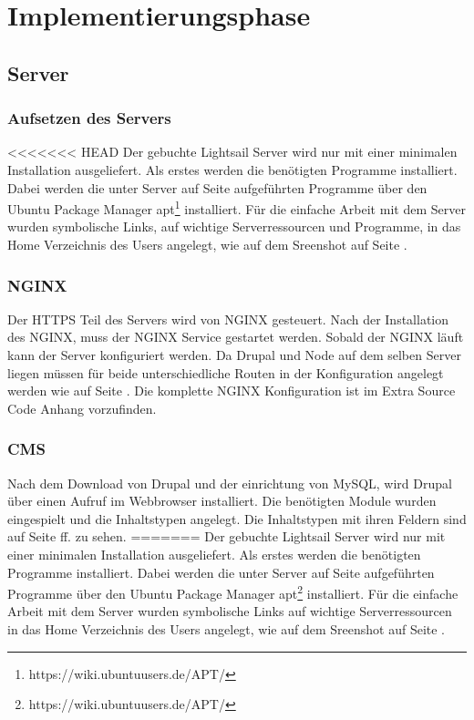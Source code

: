 \documentclass[11pt,a4paper]{article}
\begin{document}
\section{Implementierungsphase}
\subsection{Server}
\subsubsection{Aufsetzen des Servers}
<<<<<<< HEAD
Der gebuchte Lightsail Server wird nur mit einer minimalen Installation ausgeliefert. Als erstes werden die benötigten Programme installiert. Dabei werden die unter Server auf Seite \pageref{sec:progs} aufgeführten Programme über den Ubuntu Package Manager apt\footnote{https://wiki.ubuntuusers.de/APT/} installiert. Für die einfache Arbeit mit dem Server wurden symbolische Links, auf wichtige Serverressourcen und Programme, in das Home Verzeichnis des Users angelegt, wie auf dem Sreenshot auf Seite \pageref{sec:ordner} .
\subsubsection{NGINX}
Der HTTPS Teil des Servers wird von NGINX gesteuert. Nach der Installation des NGINX, muss der NGINX Service gestartet werden. Sobald der NGINX läuft kann der Server konfiguriert werden. Da Drupal und Node auf dem selben Server liegen müssen für beide unterschiedliche Routen in der Konfiguration angelegt werden wie auf Seite \pageref{sec:nginx}. Die komplette NGINX Konfiguration ist im Extra Source Code Anhang vorzufinden.
\subsubsection{CMS}
Nach dem Download von Drupal und der einrichtung von MySQL, wird Drupal über einen Aufruf im Webbrowser installiert. Die benötigten Module wurden eingespielt und die Inhaltstypen angelegt.
Die Inhaltstypen mit ihren Feldern sind auf Seite \pageref{sec:content} ff. zu sehen.
=======
Der gebuchte Lightsail Server wird nur mit einer minimalen Installation ausgeliefert. Als erstes werden die benötigten Programme installiert. Dabei werden die unter Server auf Seite \pageref{sec:progs} aufgeführten Programme über den Ubuntu Package Manager apt\footnote{https://wiki.ubuntuusers.de/APT/} installiert. Für die einfache Arbeit mit dem Server wurden symbolische Links auf wichtige Serverressourcen in das Home Verzeichnis des Users angelegt, wie auf dem Sreenshot auf Seite \pageref{sec:ordner} .
\end{document}
